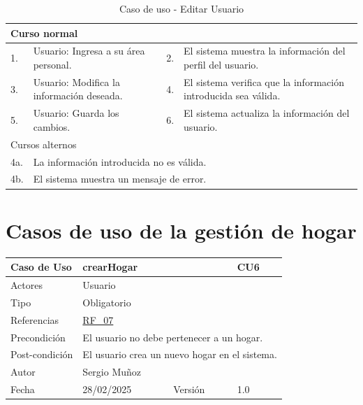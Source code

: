 \begin{table}[H]
    \centering
    \begin{tabular}{| m{} | m{} | m{} | m{} |}
        \hline
        \multicolumn{4}{|m{0.9\textwidth}|}{Curso normal} \\ 
        \hline
        1. & Usuario: Ingresa a su área personal.
        & 2. & El sistema muestra la información del perfil del usuario. \\ 
        \hline
        3. & Usuario: Modifica la información deseada. 
        & 4. & El sistema verifica que la información introducida sea válida. \\ 
        \hline
        5. & Usuario: Guarda los cambios. 
        & 6. & El sistema actualiza la información del usuario. \\ 
        \hline
        \multicolumn{4}{|m{0.9\textwidth}|}{Cursos alternos} \\ 
        \hline 
        4a. & \multicolumn{3}{l|}{La información introducida no es válida.} \\ 
        \hline
        4b. & \multicolumn{3}{l|}{El sistema muestra un mensaje de error.} \\ 
        \hline
    \end{tabular}
    \caption{Caso de uso - Editar Usuario}
\end{table}

\newpage


\section{Casos de uso de la gestión de hogar}

\begin{table}[H]
    \centering
    \begin{tabular}{| m{} | m{} | m{} | m{} |}
        \hline
        \rowcolor[HTML]{C0C0C0} Caso de Uso & \multicolumn{2}{|m{0.43\textwidth}|}{crearHogar} &  CU6\\ 
        \hline
        Actores & \multicolumn{3}{l|}{Usuario} \\ 
        \hline
        Tipo & \multicolumn{3}{l|}{Obligatorio} \\ 
        \hline
        Referencias & \multicolumn{3}{l|}{\hyperref[req:RF07]{RF\_07}} \\ 
        \hline
        Precondición & \multicolumn{3}{l|}{El usuario no debe pertenecer a un hogar.} \\ 
        \hline
        Post-condición & \multicolumn{3}{l|}{El usuario crea un nuevo hogar en el sistema.} \\ 
        \hline
        Autor & \multicolumn{3}{l|}{Sergio Muñoz} \\ 
        \hline
        Fecha & 28/02/2025 & Versión & 1.0 \\ 
        \hline
    \end{tabular}
\end{table}

